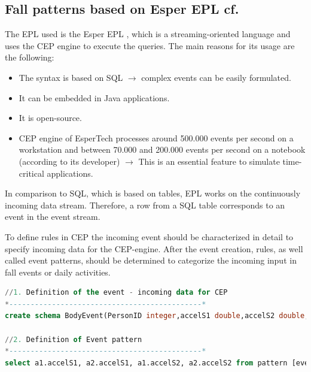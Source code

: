 \documentclass[10pt,journal,compsoc]{IEEEtran}
\begin{document}
\subsection{Fall patterns based on Esper EPL cf.\cite{LorenaFall}}
\label{subsec:CEP}
The EPL used is the Esper EPL \cite{Esper:2016}, which is a streaming-oriented language and uses the CEP engine to execute the queries. The main reasons for its usage are the following:
\begin{itemize}
	\item The syntax is based on SQL $\rightarrow$ complex events can be easily formulated.
	\item It can be embedded in Java applications.
	\item It is open-source.
	\item CEP engine of EsperTech processes around 500.000 events per second on a workstation and between 70.000 and 200.000 events per second on a notebook (according to its developer) $\rightarrow$ This is an essential feature to simulate time-critical applications. 
\end{itemize}
In comparison to SQL, which is based on tables, EPL works on the continuously incoming data stream. Therefore, a row from a SQL table corresponds to an event in the event stream. 

To define rules in CEP the incoming event should be characterized in detail to specify incoming data for the CEP-engine. After the event creation, rules, as well called event patterns, should be determined to categorize the incoming input in fall events or daily activities.
\renewcommand{\lstlistingname}{Example}
\begin{lstlisting}[basicstyle=\ttfamily\footnotesize,language=SQL,caption=Fall pattern based on Kozina et al. cf.\cite{LorenaFall,Kozina}.,label=CEPPattern, breaklines=true]
//1. Definition of the event - incoming data for CEP
*---------------------------------------------*
create schema BodyEvent(PersonID integer,accelS1 double,accelS2 double,timestamp string)

//2. Definition of Event pattern
*---------------------------------------------*
select a1.accelS1, a2.accelS1, a1.accelS2, a2.accelS2 from pattern [every(a1=BodyEvent(a1.accelS1 <= 9.81) -> a2=BodyEvent(a2.accelS1-a1.accelS1 >= 9.81 and a1.PersonID = a2.PersonID) where timer:within(1sec)) or every (a1=BodyEvent(a1.accelS2 <= 9.81)-> a2=BodyEvent(a2.accelS2-a1.accelS2 >= 9.81 and a1.PersonID = a2.PersonID) where timer:within(1sec))];
\end{lstlisting}
\end{document}
